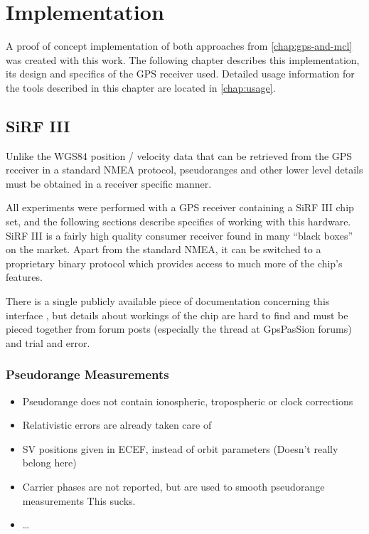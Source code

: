 \chapter{Implementation}
\label{chap:implementation}

A proof of concept implementation of both approaches from \cref{chap:gps-and-mcl}
was created with this work.
The following chapter describes this implementation, its design and
specifics of the GPS receiver used.
Detailed usage information for the tools described in this chapter are located in
\cref{chap:usage}.

\section{SiRF III}
\label{sec:impl-sirf}

Unlike the WGS84 position / velocity data that can be retrieved from the GPS receiver in a standard
NMEA protocol, pseudoranges and other lower level details must be obtained
in a receiver specific manner.

All experiments were performed with a GPS receiver containing
a SiRF III chip set, and the following sections describe specifics of working with
this hardware.
SiRF III is a fairly high quality consumer receiver found in many
\enquote{black boxes} on the market.
Apart from the standard NMEA, it can be switched to a proprietary binary protocol
which provides access to much more of the chip's features.

There is a single publicly available piece of documentation concerning this
interface \cite{sirf-protocol}, but details about workings of the chip are hard
to find and must be pieced together from forum posts (especially the thread
\cite{gpspassion-sirf} at GpsPasSion forums) and trial and error.

\subsection{Pseudorange Measurements}
\begin{itemize}
\item Pseudorange does not contain ionospheric, tropospheric or clock corrections
\item Relativistic errors are already taken care of 
\item SV positions given in ECEF, instead of orbit parameters (Doesn't really belong here)
\item Carrier phases are not reported, but are used to smooth pseudorange measurements
    This sucks.
\item \ldots
\end{itemize}

